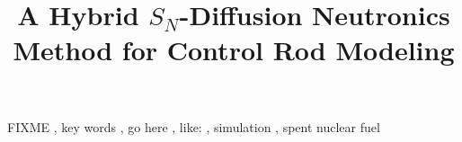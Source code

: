 \documentclass[review]{elsarticle}
\begin{document}
\begin{frontmatter}
\title{A Hybrid $S_N$-Diffusion Neutronics Method for Control Rod Modeling}






\begin{keyword}
FIXME \sep
key words \sep
go here \sep
like: \sep 
simulation \sep
spent nuclear fuel 
\end{keyword}


\end{frontmatter}
\glsresetall

\linenumbers


%



%
%
%
%



%
\end{document}

